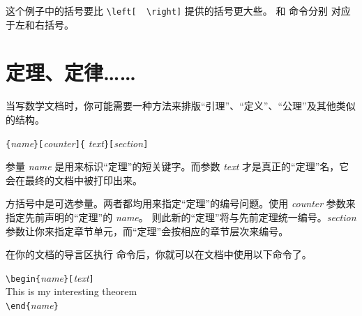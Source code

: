 \noindent 这个例子中的括号要比 \verb|\left[  \right]| 提供的括号更大些。 和  命令分别
对应于左和右括号。

\section{定理、定律……}
当写数学文档时，你可能需要一种方法来排版“引理”、“定义”、“公理”及其他类似的结构。
\begin{lscommand}
\verb|{|\emph{name}\verb|}[|\emph{counter}\verb|]{|%
         \emph{text}\verb|}[|\emph{section}\verb|]|
\end{lscommand}
%
%

参量 \emph{name} 是用来标识“定理”的短关键字。而参数 \emph{text} 才是真正的“定理”名，它会在最终的文档中被打印出来。

方括号中是可选参量。两者都均用来指定“定理”的编号问题。使用 \emph{counter} 参数来指定先前声明的“定理”的 \emph{name}。
则此新的“定理”将与先前定理统一编号。\emph{section} 参数让你来指定章节单元，而“定理”会按相应的章节层次来编号。

在你的文档的导言区执行  命令后，你就可以在文档中使用以下命令了。


\begin{code}
\verb|\begin{|\emph{name}\verb|}[|\emph{text}\verb|]|\\
This is my interesting theorem\\
\verb|\end{|\emph{name}\verb|}|
\end{code}

